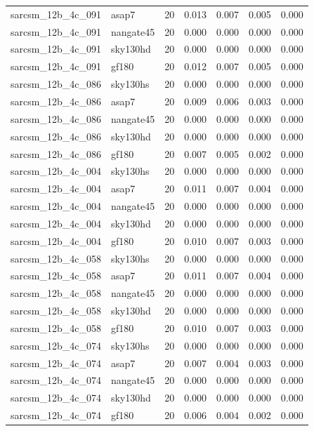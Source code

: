 \begin{tabular}{llrrrrr}
sarcsm\_12b\_4c\_091 & asap7 & 20 & 0.013 & 0.007 & 0.005 & 0.000 \\
sarcsm\_12b\_4c\_091 & nangate45 & 20 & 0.000 & 0.000 & 0.000 & 0.000 \\
sarcsm\_12b\_4c\_091 & sky130hd & 20 & 0.000 & 0.000 & 0.000 & 0.000 \\
sarcsm\_12b\_4c\_091 & gf180 & 20 & 0.012 & 0.007 & 0.005 & 0.000 \\
sarcsm\_12b\_4c\_086 & sky130hs & 20 & 0.000 & 0.000 & 0.000 & 0.000 \\
sarcsm\_12b\_4c\_086 & asap7 & 20 & 0.009 & 0.006 & 0.003 & 0.000 \\
sarcsm\_12b\_4c\_086 & nangate45 & 20 & 0.000 & 0.000 & 0.000 & 0.000 \\
sarcsm\_12b\_4c\_086 & sky130hd & 20 & 0.000 & 0.000 & 0.000 & 0.000 \\
sarcsm\_12b\_4c\_086 & gf180 & 20 & 0.007 & 0.005 & 0.002 & 0.000 \\
sarcsm\_12b\_4c\_004 & sky130hs & 20 & 0.000 & 0.000 & 0.000 & 0.000 \\
sarcsm\_12b\_4c\_004 & asap7 & 20 & 0.011 & 0.007 & 0.004 & 0.000 \\
sarcsm\_12b\_4c\_004 & nangate45 & 20 & 0.000 & 0.000 & 0.000 & 0.000 \\
sarcsm\_12b\_4c\_004 & sky130hd & 20 & 0.000 & 0.000 & 0.000 & 0.000 \\
sarcsm\_12b\_4c\_004 & gf180 & 20 & 0.010 & 0.007 & 0.003 & 0.000 \\
sarcsm\_12b\_4c\_058 & sky130hs & 20 & 0.000 & 0.000 & 0.000 & 0.000 \\
sarcsm\_12b\_4c\_058 & asap7 & 20 & 0.011 & 0.007 & 0.004 & 0.000 \\
sarcsm\_12b\_4c\_058 & nangate45 & 20 & 0.000 & 0.000 & 0.000 & 0.000 \\
sarcsm\_12b\_4c\_058 & sky130hd & 20 & 0.000 & 0.000 & 0.000 & 0.000 \\
sarcsm\_12b\_4c\_058 & gf180 & 20 & 0.010 & 0.007 & 0.003 & 0.000 \\
sarcsm\_12b\_4c\_074 & sky130hs & 20 & 0.000 & 0.000 & 0.000 & 0.000 \\
sarcsm\_12b\_4c\_074 & asap7 & 20 & 0.007 & 0.004 & 0.003 & 0.000 \\
sarcsm\_12b\_4c\_074 & nangate45 & 20 & 0.000 & 0.000 & 0.000 & 0.000 \\
sarcsm\_12b\_4c\_074 & sky130hd & 20 & 0.000 & 0.000 & 0.000 & 0.000 \\
sarcsm\_12b\_4c\_074 & gf180 & 20 & 0.006 & 0.004 & 0.002 & 0.000 \\

\end{tabular}
